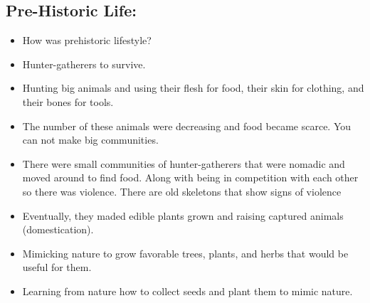\documentclass{article}
\begin{document}
\subsection{Pre-Historic Life:}
\begin{itemize}
  \item How was prehistoric lifestyle?
  \item Hunter-gatherers to survive.
  \item Hunting big animals and using their flesh for food,
    their skin for clothing, and their bones for tools.
  \item The number of these animals were decreasing and
    food became scarce. You can not make big communities.
  \item There were small communities of hunter-gatherers
    that were nomadic and moved around to find food.
    Along with being in competition with each other
    so there was violence.
    There are old skeletons that show signs of violence
  \item Eventually, they maded edible plants grown and raising captured animals (domestication).
  \item Mimicking nature to grow favorable trees, plants, and herbs that would be useful for them.
  \item Learning from nature how to collect seeds and plant them to mimic nature.
\end{itemize}
\end{document}
